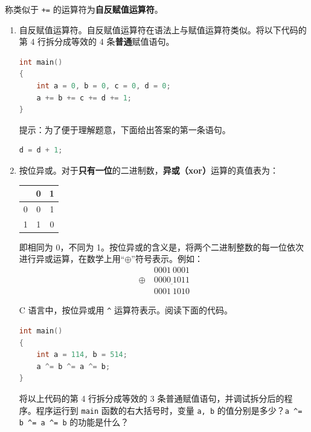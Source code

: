 \begin{problemset}
	称类似于 \lstinline{+=} 的运算符为\textbf{自反赋值运算符}。

	\begin{enumerate}
		\item 自反赋值运算符。自反赋值运算符在语法上与赋值运算符类似。将以下代码的第 4 行拆分成等效的 4 条\textbf{普通}赋值语句。

		\begin{lstlisting}[language=c]
int main()
{
	int a = 0, b = 0, c = 0, d = 0;
	a += b += c += d += 1;
}
		\end{lstlisting}

		提示：为了便于理解题意，下面给出答案的第一条语句。

		\begin{lstlisting}[language=c, numbers=none]
d = d + 1;
		\end{lstlisting}

		\item 按位异或。对于\textbf{只有一位}的二进制数，\textbf{异或（xor）}运算的真值表为：
		\begin{table}[H]
			\centering
			\begin{tabular}{c|c|c|}
				& 0 & 1
				\\\hline
				0 & 0 & 1
				\\\hline
				1 & 1 & 0
				\\\hline
			\end{tabular}
		\end{table}

		即相同为 0，不同为 1。按位异或的含义是，将两个二进制整数的每一位依次进行异或运算，在数学上用“$\oplus$”符号表示。例如：
		$$
		\begin{aligned}
			& 0001~0001
			\\
			\oplus~ & \underline{0000~1011}
			\\
			& 0001~1010
		\end{aligned}
		$$

		C 语言中，按位异或用 \lstinline{^} 运算符表示。阅读下面的代码。

		\begin{lstlisting}[language=c]
int main()
{
	int a = 114, b = 514;
	a ^= b ^= a ^= b;
}
		\end{lstlisting}

		将以上代码的第 4 行拆分成等效的 3 条普通赋值语句，并调试拆分后的程序。程序运行到 \lstinline{main} 函数的右大括号时，变量 \lstinline{a, b} 的值分别是多少？\lstinline{a ^= b ^= a ^= b} 的功能是什么？
	\end{enumerate}


\end{problemset}

